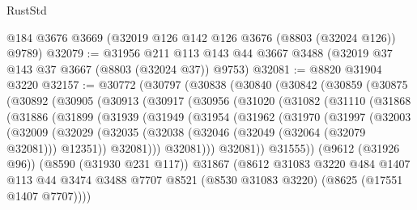 \begin{lexlean}{RustStd}
\begin{coremodule}
    @184
    @3676
    @3669
    (@32019 @126 @142 @126 @3676 (@8803 (@32024 @126)) @9789)
@32079 := @31956
    @211
    @113
    @143
    @44
    @3667
    @3488
    (@32019 @37 @143 @37 @3667 (@8803 (@32024 @37)) @9753)
@32081 := @8820 @31904 @3220
@32157 := @30772
    (@30797
      (@30838
        (@30840
          (@30842
            (@30859
              (@30875
                (@30892
                  (@30905
                    (@30913
                      (@30917
                        (@30956
                          (@31020
                            (@31082
                              (@31110
                                (@31868
                                  (@31886
                                    (@31899
                                      (@31939
                                        (@31949
                                          (@31954
                                            (@31962
                                              (@31970
                                                (@31997
                                                  (@32003
                                                    (@32009
                                                      (@32029
                                                        (@32035
                                                          (@32038
                                                            (@32046
                                                              (@32049 (@32064 (@32079 @32081)))
                                                              @12351))
                                                          @32081)))
                                                    @32081)))
                                              @32081))
                                          @31555))
                                      (@9612 (@31926 @96))
                                      (@8590 (@31930 @231 @117))
                                      @31867
                                      (@8612
                                        @31083
                                        @3220
                                        @484
                                        @1407
                                        @113
                                        @44
                                        @3474
                                        @3488
                                        @7707
                                        @8521
                                        (@8530 @31083 @3220)
                                        (@8625 (@17551 @1407 @7707))))

\end{coremodule}
\end{lexlean}
